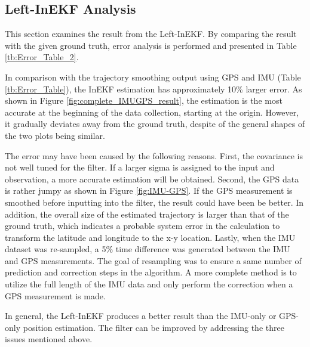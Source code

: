 
\subsection{Left-InEKF Analysis}

This section examines the result from the Left-InEKF. By comparing the result with the given ground truth, error analysis is performed and presented in Table \ref{tb:Error_Table_2}.

\begin{table}[h]
	\captionsetup[table]{position=here}
    \caption{\label{tb:Error_Table_2}
    Error Analysis for Left-InEKF
    } 
    \begin{center}
    \end{center}
\end{table}

In comparison with the trajectory smoothing output using GPS and IMU (Table \ref{tb:Error_Table}), the InEKF estimation has approximately 10\% larger error. As shown in Figure \ref{fig:complete_IMUGPS_result}, the estimation is the most accurate at the beginning of the data collection, starting at the origin. However, it gradually deviates away from the ground truth, despite of the general shapes of the two plots being similar. 

The error may have been caused by the following reasons. First, the covariance is not well tuned for the filter. If a larger sigma is assigned to the input and observation, a more accurate estimation will be obtained. Second, the GPS data is rather jumpy as shown in Figure \ref{fig:IMU-GPS}. If the GPS measurement is smoothed before inputting into the filter, the result could have been be better. In addition, the overall size of the estimated trajectory is larger than that of the ground truth, which indicates a probable system error in the calculation to transform the latitude and longitude to the x-y location. Lastly, when the IMU dataset was re-sampled, a 5\% time difference was generated between the IMU and GPS measurements. The goal of resampling was to ensure a same number of prediction and correction steps in the algorithm. A more complete method is to utilize the full length of the IMU data and only perform the correction when a GPS measurement is made. 

In general, the Left-InEKF produces a better result than the IMU-only or GPS-only position estimation. The filter can be improved by addressing the three issues mentioned above. 
